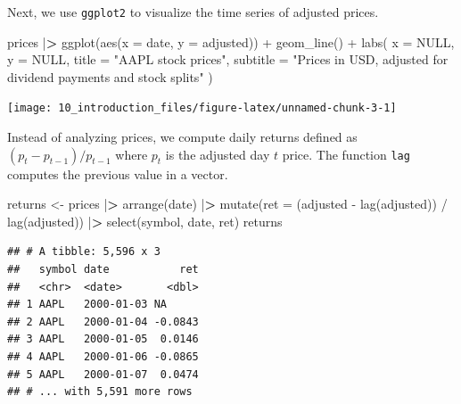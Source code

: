 \documentclass[
]{krantz}
\newenvironment{Shaded}{\begin{snugshade}}{\end{snugshade}}
\newcommand{\AttributeTok}[1]{\textcolor[rgb]{0.61,0.61,0.61}{#1}}
\newcommand{\ConstantTok}[1]{\textcolor[rgb]{0,0,0}{#1}}
\newcommand{\ErrorTok}[1]{\textcolor[rgb]{0.14,0.14,0.14}{\textbf{#1}}}
\newcommand{\FunctionTok}[1]{\textcolor[rgb]{0,0,0}{#1}}
\newcommand{\NormalTok}[1]{#1}
\newcommand{\OtherTok}[1]{\textcolor[rgb]{0.37,0.37,0.37}{#1}}
\newcommand{\SpecialCharTok}[1]{\textcolor[rgb]{0,0,0}{#1}}
\newcommand{\StringTok}[1]{\textcolor[rgb]{0.5,0.5,0.5}{#1}}
\begin{document}
Next, we use \texttt{ggplot2} to visualize the time series of adjusted prices.

\begin{Shaded}
\begin{Highlighting}[]
\NormalTok{prices }\SpecialCharTok{|}\ErrorTok{\textgreater{}}
  \FunctionTok{ggplot}\NormalTok{(}\FunctionTok{aes}\NormalTok{(}\AttributeTok{x =}\NormalTok{ date, }\AttributeTok{y =}\NormalTok{ adjusted)) }\SpecialCharTok{+}
  \FunctionTok{geom\_line}\NormalTok{() }\SpecialCharTok{+}
  \FunctionTok{labs}\NormalTok{(}
    \AttributeTok{x =} \ConstantTok{NULL}\NormalTok{,}
    \AttributeTok{y =} \ConstantTok{NULL}\NormalTok{,}
    \AttributeTok{title =} \StringTok{"AAPL stock prices"}\NormalTok{,}
    \AttributeTok{subtitle =} \StringTok{"Prices in USD, adjusted for dividend payments and stock splits"}
\NormalTok{  )}
\end{Highlighting}
\end{Shaded}

\begin{center}\texttt{[image: 10\_introduction\_files/figure-latex/unnamed-chunk-3-1]} \end{center}

Instead of analyzing prices, we compute daily returns defined as \((p_t - p_{t-1}) / p_{t-1}\) where \(p_t\) is the adjusted day \(t\) price. The function \texttt{lag} computes the previous value in a vector.

\begin{Shaded}
\begin{Highlighting}[]
\NormalTok{returns }\OtherTok{\textless{}{-}}\NormalTok{ prices }\SpecialCharTok{|}\ErrorTok{\textgreater{}}
  \FunctionTok{arrange}\NormalTok{(date) }\SpecialCharTok{|}\ErrorTok{\textgreater{}}
  \FunctionTok{mutate}\NormalTok{(}\AttributeTok{ret =}\NormalTok{ (adjusted }\SpecialCharTok{{-}} \FunctionTok{lag}\NormalTok{(adjusted)) }\SpecialCharTok{/} \FunctionTok{lag}\NormalTok{(adjusted)) }\SpecialCharTok{|}\ErrorTok{\textgreater{}}
  \FunctionTok{select}\NormalTok{(symbol, date, ret)}
\NormalTok{returns}
\end{Highlighting}
\end{Shaded}

\begin{verbatim}
## # A tibble: 5,596 x 3
##   symbol date           ret
##   <chr>  <date>       <dbl>
## 1 AAPL   2000-01-03 NA     
## 2 AAPL   2000-01-04 -0.0843
## 3 AAPL   2000-01-05  0.0146
## 4 AAPL   2000-01-06 -0.0865
## 5 AAPL   2000-01-07  0.0474
## # ... with 5,591 more rows
\end{verbatim}
\end{document}
